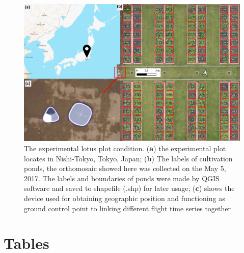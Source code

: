 \documentclass{configs/bmcart}
\begin{document}
\begin{backmatter}
\begin{figure}[h]
  \includegraphics[width=0.95\linewidth]{figures/map.pdf}
  \caption{The experimental lotus plot condition. (\textbf{a}) the experimental plot locates in Nishi-Tokyo, Tokyo, Japan; (\textbf{b}) The labels of cultivation ponds, the orthomosaic showed here was collected on the May 5, 2017. The labels and boundaries of ponds were made by QGIS software and saved to shapefile (\*.shp) for later usage; (\textbf{c}) shows the device used for obtaining geographic position and functioning as ground control point to linking different flight time series together}
  \label{fig:map}
\end{figure}


\section*{Tables}


\end{backmatter}
\end{document}
